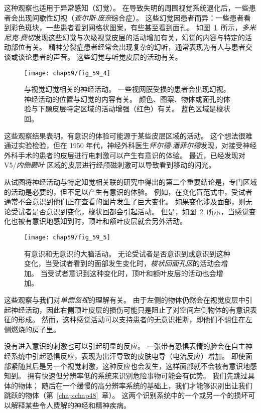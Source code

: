这种观察也适用于异常感知（幻觉）。
在导致失明的周围视觉系统退化后，一些患者会出现间歇性幻视（\textit{查尔斯$\cdot$庞奈}综合症）。
这些幻觉因患者而异：一些患者看到彩色斑块，一些患者看到网格状图案，有些甚至看到面孔。
如图~\ref{fig:59_4}~所示，\textit{多米尼克$\cdot$费切}发现这些幻觉与次级视觉皮层的活动增加有关，幻觉的内容与特定的活动部位有关。
精神分裂症患者经常会出现复杂的幻听，通常表现为有人与患者交谈或谈论患者的声音。
这些幻觉与听觉皮层的活动有关。


\begin{figure}[htbp]
	\centering
	\texttt{[image: chap59/fig\_59\_4]}
	\caption{与视觉幻觉相关的神经活动。
		一些视网膜受损的患者会出现幻视。
		神经活动的位置与幻觉的内容有关。
		颜色、图案、物体或面孔的体验与下颞皮层特定区域的活动增强（红色）有关。
		蓝色区域是梭状回\cite{howard1998anatomy}。}
	\label{fig:59_4}
\end{figure}


这些观察结果表明，有意识的体验可能源于某些皮层区域的活动。
这个想法很难通过实验检验，但在 1950 年代，神经外科医生\textit{怀尔德$\cdot$潘菲尔德}发现，对接受神经外科手术的患者的皮层进行电刺激可以产生有意识的体验。
最近，已经发现对 V5/\textit{内侧颞叶} 区域的皮层进行经颅磁刺激可以导致看到移动的闪光。


从试图将神经活动与特定知觉相关联的研究中得出的第二个重要结论是，专门区域的活动是必要的，但不足以产生有意识的体验。
例如，在变化盲范式中，受试者通常不会意识到他们正在查看的图片发生了巨大变化。
如果变化涉及面部，则无论受试者是否意识到变化，梭状回都会引起活动。
但是，如图~\ref{fig:59_5}~所示，当感觉变化也被有意识地感知到时，顶叶和额叶皮层就会另外活动。


\begin{figure}[htbp]
	\centering
	\texttt{[image: chap59/fig\_59\_5]}
	\caption{有意识和无意识的大脑活动。
		无论受试者是否意识到或意识到这种变化，当受试者看到的面部发生变化时，\textit{梭状回面孔区}的活动会增加。
		当受试者意识到这种变化时，顶叶和额叶皮层的活动也会增加\cite{beck2001neural}。}
	\label{fig:59_5}
\end{figure}


这些观察与我们对\textit{单侧忽视}的理解有关。
由于左侧的物体仍然会在视觉皮层中引起神经活动，因此右侧顶叶皮层的损伤可能只是阻止了对空间左侧物体的有意识表征的形成。
然而，这种感觉活动可以支持患者的无意识推断，即他们不想住在左侧燃烧的房子里。


没有进入意识的刺激也可以引起明显的反应。
一张带有恐惧表情的脸会在自主神经系统中引起恐惧反应，表现为出汗导致的皮肤电导（电流反应）增加。
即使面部紧随其后是另一个视觉刺激，这种反应也会发生，这样面部就不会被有意识地感知到。
拥有快速但分辨率低的系统来识别危险事物可能会有优势。
我们先跳过具体的物体；
随后在一个缓慢的高分辨率系统的基础上，我们才能够识别出让我们跳跃的物体（第~\ref{chap:chap48}~章）。
这两个识别系统中的一个或另一个的损坏可以解释某些令人费解的神经和精神疾病。



